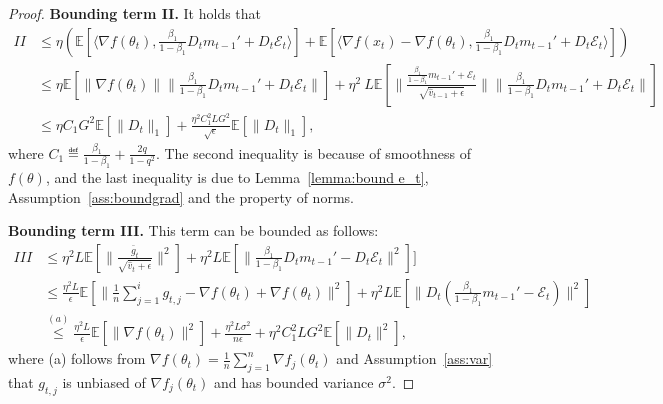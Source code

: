 \documentclass[11pt]{article}
\begin{document}
\begin{proof}
\textbf{Bounding term II.} It holds that
\begin{align}
    II&\leq\eta(\mathbb E[\langle  \nabla f(\theta_t),\frac{\beta_1}{1-\beta_1}D_tm_{t-1}'+D_t\mathcal E_t\rangle]+\mathbb E[\langle  \nabla f(x_t)-\nabla f(\theta_t),\frac{\beta_1}{1-\beta_1}D_tm_{t-1}'+D_t\mathcal E_t\rangle]) \nonumber\\
    &\leq \eta\mathbb E[\|\nabla f(\theta_t)\|\|\frac{\beta_1}{1-\beta_1}D_tm_{t-1}'+D_t\mathcal E_t\|]+\eta^2 \ L \mathbb E[\|\frac{\frac{\beta_1}{1-\beta_1}m_{t-1}'+\mathcal E_t}{\sqrt{\hat v_{t-1}+\epsilon}}\| \|\frac{\beta_1}{1-\beta_1}D_tm_{t-1}'+D_t\mathcal E_t\|] \nonumber\\
    &\leq \eta C_1 G^2 \mathbb E[\|D_t\|_1]+\frac{\eta^2 C_1^2 LG^2}{\sqrt\epsilon}\mathbb E[\|D_t\|_1],  \label{eq:II}
\end{align}
where $C_1\eqdef \frac{\beta_1}{1-\beta_1}+\frac{2q}{1-q^2}$. The second inequality is because of smoothness of $f(\theta)$, and the last inequality is due to Lemma~\ref{lemma:bound e_t}, Assumption~\ref{ass:boundgrad} and the property of norms.

\textbf{Bounding term III.} This term can be bounded as follows:
\begin{align}
    III&\leq \eta^2 L\mathbb E[\|\frac{\bar g_t}{\sqrt{\hat v_t+\epsilon}}\|^2]+\eta^2 L\mathbb E[\|\frac{\beta_1}{1-\beta_1}D_tm_{t-1}'- D_t\mathcal E_t\|^2]] \nonumber\\
    &\leq \frac{\eta^2 L}{\epsilon}\mathbb E[\|\frac{1}{n}\sum_{j=1}^i g_{t,j}-\nabla f(\theta_t)+\nabla f(\theta_t)\|^2]+\eta^2 L\mathbb E[\|D_t(\frac{\beta_1}{1-\beta_1}m_{t-1}'-\mathcal E_t)\|^2] \nonumber\\
    &\overset{(a)}{\leq} \frac{\eta^2 L}{\epsilon}\mathbb E[\|\nabla f(\theta_t)\|^2]+\frac{\eta^2 L \sigma^2}{n \epsilon}+\eta^2 C_1^2 LG^2 \mathbb E[\|D_t\|^2],  \label{eq:III}
\end{align}
where (a) follows from $\nabla f(\theta_t)=\frac{1}{n}\sum_{j=1}^n \nabla f_j(\theta_t)$ and Assumption~\ref{ass:var} that $g_{t,j}$ is unbiased of $\nabla f_j(\theta_t)$ and has bounded variance $\sigma^2$.


\end{proof}
\end{document}
